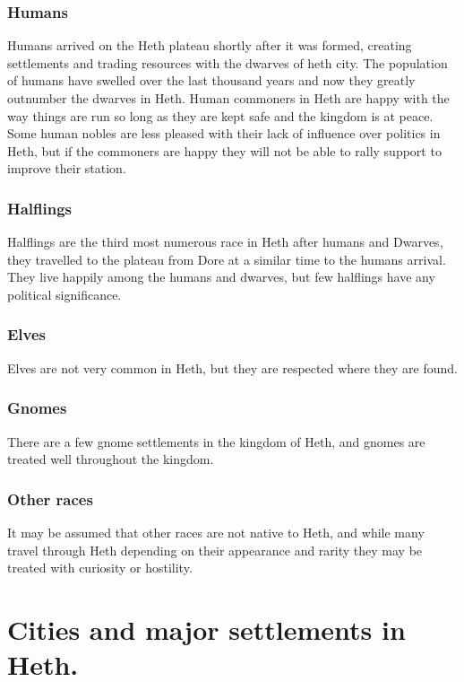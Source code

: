 \documentclass[10pt,twoside,twocolumn,openany,justified,bg=full,nomultitoc]{dndbook}
\begin{document}
\subsubsection{Humans}
\label{sec-2-2-3-1}
Humans arrived on the Heth plateau shortly after it was formed, creating settlements and trading resources with the dwarves of heth city. The population of humans have swelled over the last thousand years and now they greatly outnumber the dwarves in Heth. Human commoners in Heth are happy with the way things are run so long as they are kept safe and the kingdom is at peace. Some human nobles are less pleased with their lack of influence over politics in Heth, but if the commoners are happy they will not be able to rally support to improve their station.

\subsubsection{Halflings}
\label{sec-2-2-3-2}
Halflings are the third most numerous race in Heth after humans and Dwarves, they travelled to the plateau from Dore at a similar time to the humans arrival. They live happily among the humans and dwarves, but few halflings have any political significance.  

\subsubsection{Elves}
\label{sec-2-2-3-3}
Elves are not very common in Heth, but they are respected where they are found.  

\subsubsection{Gnomes}
\label{sec-2-2-3-4}
There are a few gnome settlements in the kingdom of Heth, and gnomes are treated well throughout the kingdom. 

\subsubsection{Other races}
\label{sec-2-2-3-5}
It may be assumed that other races are not native to Heth, and while many travel through Heth depending on their appearance and rarity they may be treated with curiosity or hostility.

\section{Cities and major settlements in Heth.}
\label{sec-2-3}
\end{document}
